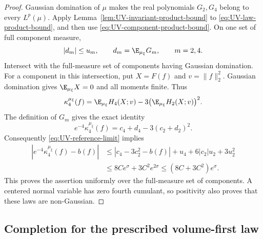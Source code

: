 \begin{proof}
Gaussian domination of $\mu$ makes the real polynomials $G_2,G_4$
belong to every $L^p(\mu)$. Apply
Lemma~\ref{lem:UV-invariant-product-bound} to
\eqref{eq:UV-law-product-bound}, and then use
\eqref{eq:UV-component-product-bound}. On one set of full
component measure,
\[
 |d_m|\le u_m,\qquad d_m=\E_{\mu_\xi}G_m,\qquad m=2,4.
\]
Intersect with the full-measure set of components having Gaussian
domination. For a component in this intersection, put $X=F(f)$
and $v=\|f\|_2^2$. Gaussian domination gives $\E_{\mu_\xi}X=0$
and all moments finite. Thus
\[
 \kappa_4^{\mu_\xi}(f)
  =\E_{\mu_\xi}H_4(X;v)
          -3\bigl(\E_{\mu_\xi}H_2(X;v)\bigr)^2.
\]
The definition of $G_m$ gives the exact identity
\begin{equation}\label{eq:UV-cumulant-identity}
 e^{-4}\kappa_4^{\mu_\xi}(f)
                =c_4+d_4-3(c_2+d_2)^2.
\end{equation}
Consequently \eqref{eq:UV-reference-limit} implies
\begin{align*}
 |e^{-4}\kappa_4^{\mu_\xi}(f)-b(f)|
 &\le |c_4-3c_2^2-b(f)|+u_4+6|c_2|u_2+3u_2^2\\
 &\le8Ce^\sigma+3C^2e^{2\sigma}
 \le(8C+3C^2)e^\sigma.
\end{align*}
This proves the assertion uniformly over the full-measure set
of components. A centered normal variable has zero fourth
cumulant, so positivity also proves that these laws are
non-Gaussian.
\end{proof}




\subsection{Completion for the prescribed volume-first law}

